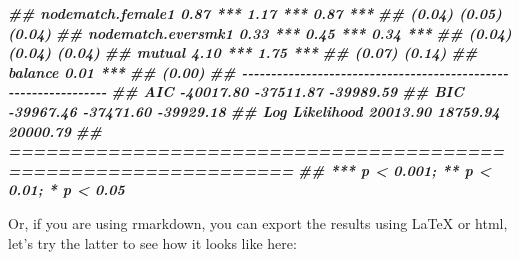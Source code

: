 \documentclass[
]{book}
\newenvironment{Shaded}{\begin{snugshade}}{\end{snugshade}}
\newcommand{\DocumentationTok}[1]{\textcolor[rgb]{0.56,0.35,0.01}{\textbf{\textit{#1}}}}
\begin{document}
\begin{Shaded}
\begin{Highlighting}[]
\DocumentationTok{\#\# nodematch.female1        0.87 ***       1.17 ***       0.87 ***}
\DocumentationTok{\#\#                         (0.04)         (0.05)         (0.04)   }
\DocumentationTok{\#\# nodematch.eversmk1       0.33 ***       0.45 ***       0.34 ***}
\DocumentationTok{\#\#                         (0.04)         (0.04)         (0.04)   }
\DocumentationTok{\#\# mutual                   4.10 ***                      1.75 ***}
\DocumentationTok{\#\#                         (0.07)                        (0.14)   }
\DocumentationTok{\#\# balance                                                0.01 ***}
\DocumentationTok{\#\#                                                       (0.00)   }
\DocumentationTok{\#\# {-}{-}{-}{-}{-}{-}{-}{-}{-}{-}{-}{-}{-}{-}{-}{-}{-}{-}{-}{-}{-}{-}{-}{-}{-}{-}{-}{-}{-}{-}{-}{-}{-}{-}{-}{-}{-}{-}{-}{-}{-}{-}{-}{-}{-}{-}{-}{-}{-}{-}{-}{-}{-}{-}{-}{-}{-}{-}{-}{-}{-}{-}{-}}
\DocumentationTok{\#\# AIC                 {-}40017.80      {-}37511.87      {-}39989.59    }
\DocumentationTok{\#\# BIC                 {-}39967.46      {-}37471.60      {-}39929.18    }
\DocumentationTok{\#\# Log Likelihood       20013.90       18759.94       20000.79    }
\DocumentationTok{\#\# ===============================================================}
\DocumentationTok{\#\# *** p \textless{} 0.001; ** p \textless{} 0.01; * p \textless{} 0.05}
\end{Highlighting}
\end{Shaded}

Or, if you are using rmarkdown, you can export the results using LaTeX or html, let's try the latter to see how it looks like here:
\end{document}
